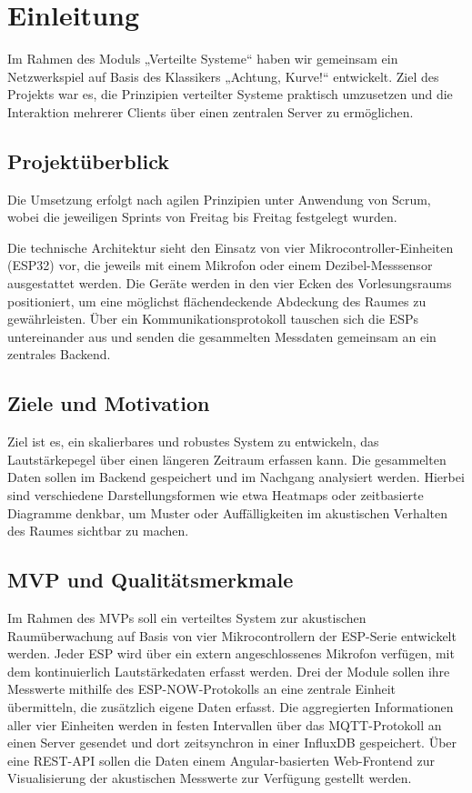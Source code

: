\chapter{Einleitung}
\label{cha:einleitung}

Im Rahmen des Moduls „Verteilte Systeme“ haben wir gemeinsam ein Netzwerkspiel auf Basis des Klassikers „Achtung, Kurve!“ entwickelt. Ziel des Projekts war es, die Prinzipien verteilter Systeme praktisch umzusetzen und die Interaktion mehrerer Clients über einen zentralen Server zu ermöglichen.

\section{Projektüberblick}

Die Umsetzung erfolgt nach agilen Prinzipien unter Anwendung von Scrum, wobei die jeweiligen Sprints von Freitag bis Freitag festgelegt wurden. 

Die technische Architektur sieht den Einsatz von vier Mikrocontroller-Einheiten (ESP32) vor, die jeweils mit einem Mikrofon oder einem Dezibel-Messsensor ausgestattet werden. 
Die Geräte werden in den vier Ecken des Vorlesungsraums positioniert, um eine möglichst flächendeckende Abdeckung des Raumes zu gewährleisten. Über ein Kommunikationsprotokoll tauschen sich die ESPs untereinander aus und 
senden die gesammelten Messdaten gemeinsam an ein zentrales Backend.

\section{Ziele und Motivation}

Ziel ist es, ein skalierbares und robustes System zu entwickeln, das Lautstärkepegel über einen längeren Zeitraum erfassen kann. Die gesammelten Daten sollen im Backend gespeichert und im Nachgang analysiert werden. 
Hierbei sind verschiedene Darstellungsformen wie etwa Heatmaps oder zeitbasierte Diagramme denkbar, um Muster oder Auffälligkeiten im akustischen Verhalten des Raumes sichtbar zu machen.

\section{MVP und Qualitätsmerkmale}

Im Rahmen des MVPs soll ein verteiltes System zur akustischen Raumüberwachung auf Basis von vier Mikrocontrollern der ESP-Serie entwickelt werden. 
Jeder ESP wird über ein extern angeschlossenes Mikrofon verfügen, mit dem kontinuierlich Lautstärkedaten erfasst werden. Drei der Module sollen ihre Messwerte mithilfe des ESP-NOW-Protokolls an eine zentrale Einheit übermitteln, 
die zusätzlich eigene Daten erfasst. Die aggregierten Informationen aller vier Einheiten werden in festen Intervallen über das MQTT-Protokoll an einen Server gesendet und dort zeitsynchron in einer InfluxDB gespeichert. 
Über eine REST-API sollen die Daten einem Angular-basierten Web-Frontend zur Visualisierung der akustischen Messwerte zur Verfügung gestellt werden.

